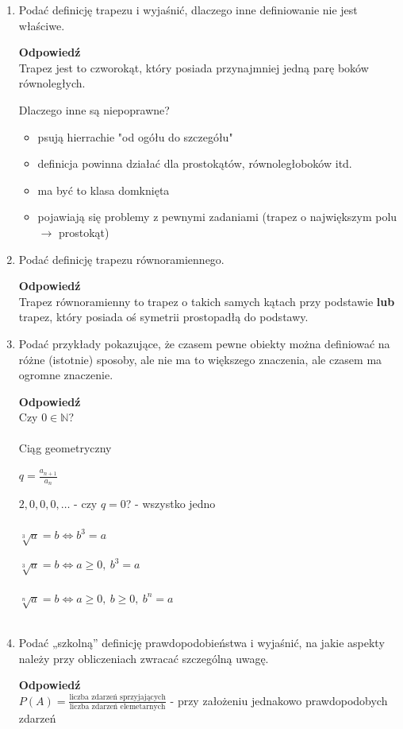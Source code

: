 \documentclass[12pt,a4paper]{article}
\newcounter{definicja}
\theoremstyle{break}
\newcommand{\Odp}[1]{
		\begin{mdframed}[style=zadanie]
			\textbf{Odpowiedź}\\
			#1
		\end{mdframed}
	}
\begin{document}
\begin{enumerate}[1.]
	\item Podać definicję trapezu i wyjaśnić, dlaczego inne definiowanie nie jest właściwe.
	\Odp{
		Trapez jest to czworokąt, który posiada przynajmniej jedną parę boków równoległych.
		
		Dlaczego inne są niepoprawne?
		\begin{itemize}
			\item psują hierrachie "od ogółu do szczegółu"
			\item definicja powinna działać dla prostokątów, równoległoboków itd.
			\item ma być to klasa domknięta
			\item pojawiają się problemy z pewnymi zadaniami (trapez o największym polu $\rightarrow$ prostokąt)
		\end{itemize}
	}
	
	\item Podać definicję trapezu równoramiennego.
	\Odp{
	Trapez równoramienny to trapez o takich samych kątach przy podstawie \textbf{lub} trapez, który posiada oś symetrii prostopadłą do podstawy.
	}
	
	\item Podać przykłady pokazujące, że czasem pewne obiekty można definiować na różne (istotnie) sposoby, ale nie ma to większego znaczenia, ale czasem ma ogromne znaczenie.
	\Odp{		
		Czy $0\in\mathbb{N}$?\\\\
		
		Ciąg geometryczny
		
		$q=\frac{a_{n+1}}{a_n}$
		
		$2,0,0,0,\dots$ - czy $q=0$? - wszystko jedno\\\\
		
		$\sqrt[3]{a}=b \Leftrightarrow b^3=a$
		
		$\sqrt[3]{a}=b \Leftrightarrow a\geq0,\: b^3=a$\\\\
		
		$\sqrt[n]{a}=b \Leftrightarrow a\geq0,\: b\geq0,\: b^n=a$\\\\
	}
	
	\item Podać „szkolną” definicję prawdopodobieństwa i wyjaśnić, na jakie aspekty należy	przy obliczeniach zwracać szczególną uwagę.
	\Odp{
		$P(A)=\frac{\text{liczba zdarzeń sprzyjających}}{\text{liczba zdarzeń elemetarnych}}$ - przy założeniu jednakowo prawdopodobych zdarzeń
	}
	

\end{enumerate}
\end{document}
